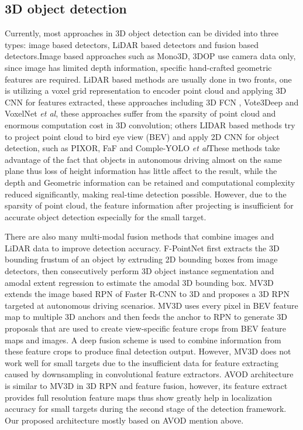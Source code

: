 \documentclass{bmvc2k}
\def\etal{\emph{et al}\bmvaOneDot}
\begin{document}
\subsection{3D object detection}
Currently, most approaches in 3D object detection can be divided into three types: image based detectors, LiDAR based detectors and fusion based detectors.Image based approaches such as Mono3D\cite{7780605}, 3DOP\cite{chen20183d} use camera data only, since image has limited depth information, specific hand-crafted geometric features are required. LiDAR based methods are usually done in two fronts, one is utilizing a voxel grid representation to encoder point cloud and applying 3D CNN for features extracted, these approaches including 3D FCN \cite{li20173d}, Vote3Deep \cite{engelcke2017vote3deep} and VoxelNet \cite{zhou2018voxelnet} \etal, these approaches suffer from the sparsity of point cloud and enormous computation cost in 3D convolution; others LIDAR based methods try to project point cloud to bird eye view (BEV) and apply 2D CNN for object detection, such as PIXOR\cite{yang2018pixor}, FaF\cite{luo2018fast} and Comple-YOLO \cite{simon2018complex} \etal These methods take advantage of the fact that objects in autonomous driving almost on the same plane thus loss of height information has little affect to the result, while the depth and Geometric information can be retained and computational complexity reduced significantly, making real-time detection possible. However, due to the sparsity of point cloud, the feature information after projecting is insufficient for accurate object detection especially for the small target.

There are also many multi-modal fusion methods that combine images and LiDAR data to improve detection accuracy. F-PointNet \cite{qi2018frustum} first extracts the 3D bounding frustum of an object by extruding 2D bounding boxes from image detectors, then consecutively perform 3D object instance segmentation and amodal extent regression to estimate the amodal 3D bounding box. MV3D\cite{chen2017multi} extends the image based RPN of Faster R-CNN\cite{ren2015faster} to 3D and proposes a 3D RPN targeted at autonomous driving scenarios. MV3D uses every pixel in BEV feature map to multiple 3D anchors and then feeds the anchor to RPN to generate 3D proposals that are used to create view-specific feature crops from BEV feature maps and images. A deep fusion scheme is used to combine information from these feature crops to produce final detection output. However, MV3D does not work well for small targets due to the insufficient data for feature extracting caused by downsampling in convolutional feature extractors. AVOD\cite{ku2018joint} architecture is similar to MV3D in 3D RPN and feature fusion, however, its feature extract provides full resolution feature maps thus show greatly help in localization accuracy for small targets during the second stage of the detection framework. Our proposed architecture mostly based on AVOD mention above.
\end{document}
